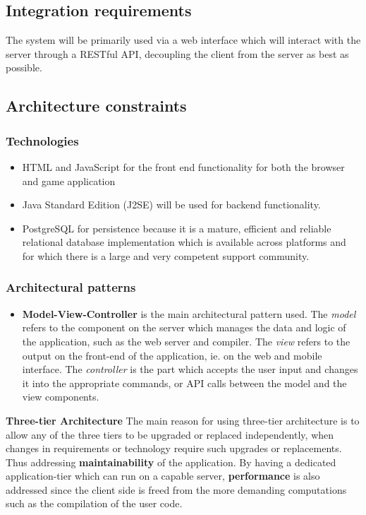 \documentclass[english]{article}
\begin{document}
			
		\subsection{Integration requirements}
			\par The system will be primarily used via a web interface which will interact with the server through a RESTful API, decoupling the client from the server as best as possible.
			
		\setcounter{secnumdepth}{5}
		\subsection{Architecture constraints}
			\subsubsection{Technologies}
			\begin{itemize}
		  \item HTML and JavaScript for the front end functionality for both the browser and game application
		  \item Java Standard Edition (J2SE) will be used for backend functionality.
		  \item PostgreSQL for persistence because it is a mature, efficient and reliable relational database
          implementation which is available across platforms and for which there is a large and very competent
         support community.
       \end{itemize}
       
		\subsubsection{Architectural patterns} %
		\begin{itemize}
			\item \textbf{Model-View-Controller} is the main architectural pattern used. The \textit{model} refers to the component on the server which manages the data and logic of the application, such as the web server and compiler. The \textit{view} refers to the output on the front-end of the application, ie. on the web and mobile interface. The \textit{controller} is the part which accepts the user input and changes it into the appropriate commands, or API calls between the model and the view components.
		\end{itemize}
		
		\iffalse
		\textbf{Three-tier Architecture} %
		The main reason for using three-tier architecture is to allow any of the three tiers to be upgraded or replaced independently, when changes in requirements or technology require such upgrades or replacements. Thus addressing \textbf{maintainability} of the application. By having a dedicated application-tier which can run on a capable server, \textbf{performance} is also addressed since the client side is freed from the more demanding computations such as the compilation of the user code.
		
\end{document}
